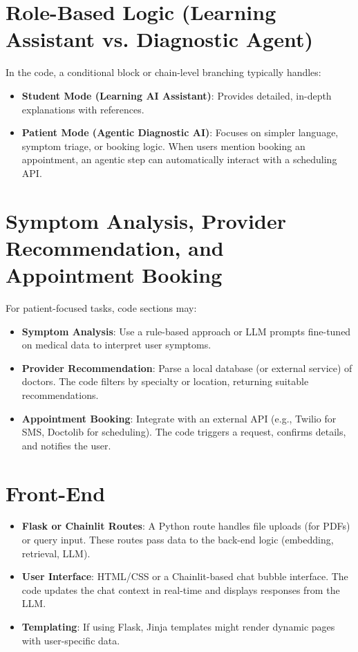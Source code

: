 \section{Role-Based Logic (Learning Assistant vs. Diagnostic Agent)}
\label{sec:role-logic}
In the code, a conditional block or chain-level branching typically handles:
\begin{itemize}
    \item \textbf{Student Mode (Learning AI Assistant)}:  
    Provides detailed, in-depth explanations with references.
    \item \textbf{Patient Mode (Agentic Diagnostic AI)}:  
    Focuses on simpler language, symptom triage, or booking logic. 
    When users mention booking an appointment, an agentic step can automatically interact with a scheduling API.
\end{itemize}

\section{Symptom Analysis, Provider Recommendation, and Appointment Booking}
\label{sec:extended-capabilities}



For patient-focused tasks, code sections may:
\begin{itemize}
    \item \textbf{Symptom Analysis}: Use a rule-based approach or LLM prompts fine-tuned on medical data to interpret user symptoms.
    \item \textbf{Provider Recommendation}: Parse a local database (or external service) of doctors. The code filters by specialty or location, returning suitable recommendations.
    \item \textbf{Appointment Booking}: Integrate with an external API (e.g., Twilio for SMS, Doctolib for scheduling). The code triggers a request, confirms details, and notifies the user.
\end{itemize}

\section{Front-End }
\label{sec:frontend}
\begin{itemize}
    \item \textbf{Flask or Chainlit Routes}: A Python route handles file uploads (for PDFs) or query input. These routes pass data to the back-end logic (embedding, retrieval, LLM).
    \item \textbf{User Interface}: HTML/CSS or a Chainlit-based chat bubble interface. The code updates the chat context in real-time and displays responses from the LLM.
    \item \textbf{Templating}: If using Flask, Jinja templates might render dynamic pages with user-specific data.
\end{itemize}


